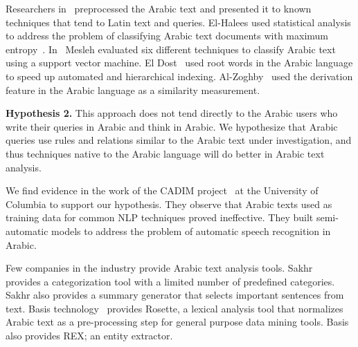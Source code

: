 \documentclass[12pt]{article}
\newcommand{\noTrRL}[1]{\transfalse\RL{#1}\transtrue}
\begin{document}
{%
Researchers in~\cite{AEL07,Ham07,Abd07,MEl03} 
preprocessed the Arabic text and presented it to known 
techniques that tend to Latin text and queries.
El-Halees used statistical analysis to address the problem of 
classifying Arabic text documents with maximum 
entropy~\cite{AEL07}.
In~\cite{Abd07} Mesleh evaluated six different techniques to 
classify Arabic text using a support vector machine.
El Dost~\cite{MEl03} used root words in the Arabic language to 
speed up automated and hierarchical indexing.
Al-Zoghby~\cite{Ham07}
used the derivation feature in 
the Arabic language as a similarity measurement.

{\bf Hypothesis 2.} This approach does not tend directly to 
the Arabic users who write their 
queries in Arabic and think in Arabic.
We hypothesize that Arabic queries use rules and 
relations similar to the Arabic text under investigation, 
and thus techniques native to the Arabic language will do better 
in Arabic text analysis.

We find evidence in the work of the CADIM \noTrRL{q-adim} 
project~\cite{Col09} at the University of Columbia to support our 
hypothesis. They observe that Arabic texts used as training 
data for common NLP techniques proved ineffective. 
They built semi-automatic models to address the problem of automatic 
speech recognition in Arabic.


Few companies in the industry provide Arabic text 
analysis tools.
Sakhr~\cite{Sak09} provides a categorization 
tool with a limited number of predefined categories.
Sakhr also provides a summary 
generator that selects important sentences from text.
Basis technology~\cite{Bas09} provides Rosette, a lexical 
analysis tool that normalizes Arabic text as a pre-processing step 
for general purpose data mining 
tools.  Basis also provides REX; an entity extractor.

}
\end{document}
